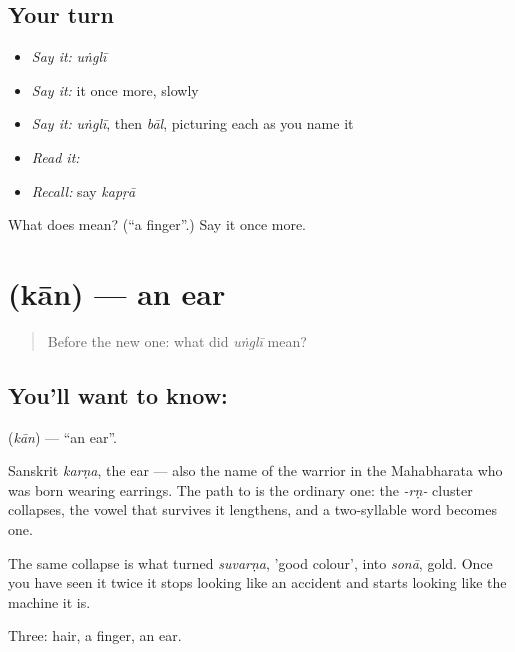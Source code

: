 \subsection*{Your turn}
\begin{itemize}
\raggedright
  \item \emph{Say it:} \emph{uṅglī}
  \item \emph{Say it:} it once more, slowly
  \item \emph{Say it:} \emph{uṅglī}, then \emph{bāl}, picturing each as you name it
  \item \emph{Read it:} \textbf{}
  \item \emph{Recall:} say \emph{kapṛā}
\end{itemize}

\begin{tcolorbox}[breakable,colback=teal!4,colframe=teal!35!black,title={Before you move on}]
What does  mean? (\textquotedblleft{}a finger\textquotedblright{}.) Say it once more.
\end{tcolorbox}
\section[\texorpdfstring{\hi{कान} (kān)}{कान (kān)}]{ (kān) — an ear}

\label{lesson:HI-C46-ear}



\begin{quote}
Before the new one: what did \emph{uṅglī} mean?
\end{quote}

\subsection*{You'll want to know: }
\textbf{} (\emph{kān}) — \textquotedblleft{}an ear\textquotedblright{}.

Sanskrit \emph{karṇa}, the ear — also the name of the warrior in the Mahabharata who was born wearing earrings. The path to  is the ordinary one: the \emph{-rṇ-} cluster collapses, the vowel that survives it lengthens, and a two-syllable word becomes one.

The same collapse is what turned \emph{suvarṇa}, 'good colour', into \emph{sonā}, gold. Once you have seen it twice it stops looking like an accident and starts looking like the machine it is.

\begin{grammarlens}[title={What you've built}]
Three: hair, a finger, an ear.
\end{grammarlens}

